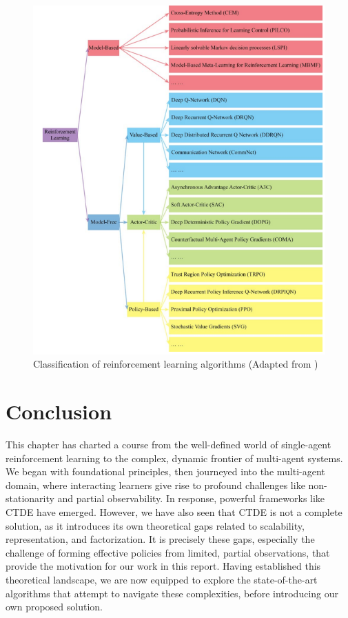 \begin{figure}[H]
    \centering
   
        
    \includegraphics[width= 0.6\linewidth]{img_pfe/Classification_of_RL.PNG}
                \caption{Classification of reinforcement learning algorithms (Adapted from \parencite{smacv2_review})}
        \label{fig:classification_of_RL}
\end{figure}
    
\section*{Conclusion}

This chapter has charted a course from the well-defined world of single-agent reinforcement learning to the complex, dynamic frontier of multi-agent systems. We began with foundational principles, then journeyed into the multi-agent domain, where interacting learners give rise to profound challenges like non-stationarity and partial observability. In response, powerful frameworks like CTDE have emerged. However, we have also seen that CTDE is not a complete solution, as it introduces its own theoretical gaps related to scalability, representation, and factorization. It is precisely these gaps, especially the challenge of forming effective policies from limited, partial observations, that provide the motivation for our work in this report. Having established this theoretical landscape, we are now equipped to explore the state-of-the-art algorithms that attempt to navigate these complexities, before introducing our own proposed solution.